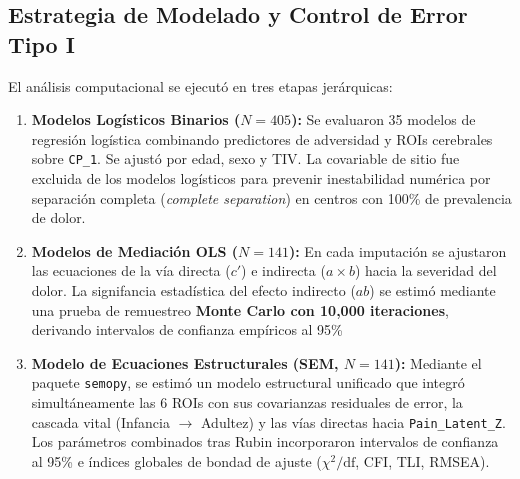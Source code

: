 \documentclass[11pt,a4paper]{article}
\begin{document}
\subsection{Estrategia de Modelado y Control de Error Tipo I}
El análisis computacional se ejecutó en tres etapas jerárquicas:
\begin{enumerate}
  \item \textbf{Modelos Logísticos Binarios ($N = 405$):} Se evaluaron 35 modelos de regresión logística combinando predictores de adversidad y ROIs cerebrales sobre \texttt{CP\_1}. Se ajustó por edad, sexo y TIV.
  La covariable de sitio fue excluida de los modelos logísticos para prevenir inestabilidad numérica por separación completa (\textit{complete separation}) en centros con 100\% de prevalencia de dolor.
  \item \textbf{Modelos de Mediación OLS ($N = 141$):} En cada imputación se ajustaron las ecuaciones de la vía directa ($c'$) e indirecta ($a \times b$) hacia la severidad del dolor. La signifancia 
  estadística del efecto indirecto ($ab$) se estimó mediante una prueba de remuestreo \textbf{Monte Carlo con 10,000 iteraciones}, derivando intervalos de confianza empíricos al 95\%
  \item \textbf{Modelo de Ecuaciones Estructurales (SEM, $N = 141$):} Mediante el paquete \texttt{semopy}, se estimó un modelo estructural unificado que integró simultáneamente las 6 ROIs con sus 
  covarianzas residuales de error, la cascada vital (Infancia $\to$ Adultez) y las vías directas hacia \texttt{Pain\_Latent\_Z}. Los parámetros combinados tras Rubin incorporaron intervalos de confianza 
  al 95\% e índices globales de bondad de ajuste ($\chi^2/\text{df}$, CFI, TLI, RMSEA).
\end{enumerate}
\end{document}
